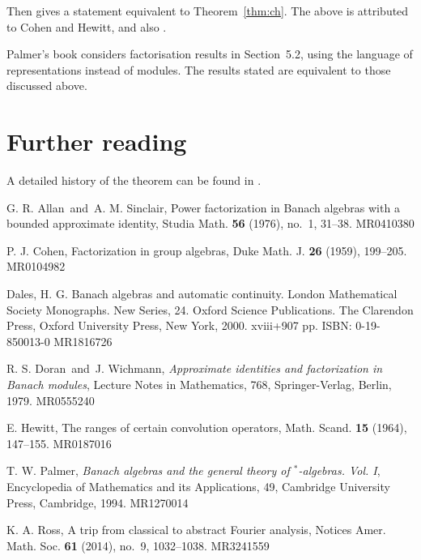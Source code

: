 \documentclass[a4paper,11pt]{article}
\theoremstyle{definition}
\begin{document}
Then \cite[Corollary~2.9.26]{dales} gives a statement equivalent to Theorem~\ref{thm:ch}.
The above is attributed to Cohen and Hewitt, and also \cite{as}.

Palmer's book \cite{palmer} considers factorisation results in Section~5.2, using the
language of representations instead of modules.  The results stated are equivalent to those
discussed above.


\section{Further reading}

A detailed history of the theorem can be found in \cite[pages~1033-34]{ross}.


\begin{thebibliography}{99}

 G. R. Allan\ and\ A. M. Sinclair, Power factorization in Banach algebras with a bounded approximate identity, Studia Math. {\bf 56} (1976), no.~1, 31--38. MR0410380

 P. J. Cohen, Factorization in group algebras, Duke Math. J. {\bf 26} (1959), 199--205. MR0104982

 Dales, H. G. Banach algebras and automatic continuity. London Mathematical Society Monographs. New Series, 24. Oxford Science Publications. The Clarendon Press, Oxford University Press, New York, 2000. xviii+907 pp. ISBN: 0-19-850013-0 MR1816726

 R. S. Doran\ and\ J. Wichmann, {\it Approximate identities and factorization in Banach modules}, Lecture Notes in Mathematics, 768, Springer-Verlag, Berlin, 1979. MR0555240

 E. Hewitt, The ranges of certain convolution operators, Math. Scand. {\bf 15} (1964), 147--155. MR0187016

 T. W. Palmer, {\it Banach algebras and the general theory of $^*$-algebras. Vol. I}, Encyclopedia of Mathematics and its Applications, 49, Cambridge University Press, Cambridge, 1994. MR1270014

 K. A. Ross, A trip from classical to abstract Fourier analysis, Notices Amer. Math. Soc. {\bf 61} (2014), no.~9, 1032--1038. MR3241559

\end{thebibliography}
\end{document}
